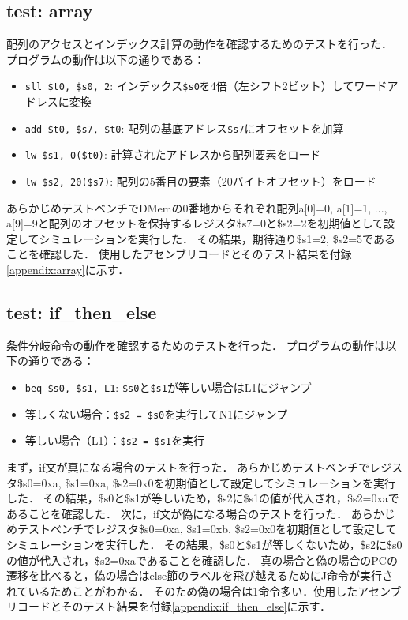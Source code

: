 \documentclass[dvipdfmx]{jsarticle}
\begin{document}
\subsection{test: array}
配列のアクセスとインデックス計算の動作を確認するためのテストを行った．
プログラムの動作は以下の通りである：
\begin{itemize}
\item \texttt{sll \$t0, \$s0, 2}: インデックス\texttt{\$s0}を4倍（左シフト2ビット）してワードアドレスに変換
\item \texttt{add \$t0, \$s7, \$t0}: 配列の基底アドレス\texttt{\$s7}にオフセットを加算
\item \texttt{lw \$s1, 0(\$t0)}: 計算されたアドレスから配列要素をロード
\item \texttt{lw \$s2, 20(\$s7)}: 配列の5番目の要素（20バイトオフセット）をロード
\end{itemize}
あらかじめテストベンチでDMemの0番地からそれぞれ配列a[0]=0, a[1]=1, ..., a[9]=9と配列のオフセットを保持するレジスタ\$s7=0と\$s2=2を初期値として設定してシミュレーションを実行した．
その結果，期待通り\$s1=2, \$s2=5であることを確認した．
使用したアセンブリコードとそのテスト結果を付録\ref{appendix:array}に示す．

\subsection{test: if\_then\_else}
条件分岐命令の動作を確認するためのテストを行った．
プログラムの動作は以下の通りである：
\begin{itemize}
\item \texttt{beq \$s0, \$s1, L1}: \texttt{\$s0}と\texttt{\$s1}が等しい場合はL1にジャンプ
\item 等しくない場合：\texttt{\$s2 = \$s0}を実行してN1にジャンプ
\item 等しい場合（L1）：\texttt{\$s2 = \$s1}を実行
\end{itemize}
まず，if文が真になる場合のテストを行った．
あらかじめテストベンチでレジスタ\$s0=0xa, \$s1=0xa, \$s2=0x0を初期値として設定してシミュレーションを実行した．
その結果，\$s0と\$s1が等しいため，\$s2に\$s1の値が代入され，\$s2=0xaであることを確認した．
次に，if文が偽になる場合のテストを行った．
あらかじめテストベンチでレジスタ\$s0=0xa, \$s1=0xb, \$s2=0x0を初期値として設定してシミュレーションを実行した．
その結果，\$s0と\$s1が等しくないため，\$s2に\$s0の値が代入され，\$s2=0xaであることを確認した．
真の場合と偽の場合のPCの遷移を比べると，偽の場合はelse節のラベルを飛び越えるためにJ命令が実行されているためことがわかる．
そのため偽の場合は1命令多い．使用したアセンブリコードとそのテスト結果を付録\ref{appendix:if_then_else}に示す．
\end{document}
